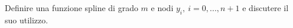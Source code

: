 Definire una funzione spline di grado $m$ e  nodi ${y_i},\ 
i=0,...,n+1$ e discutere il suo utilizzo.
